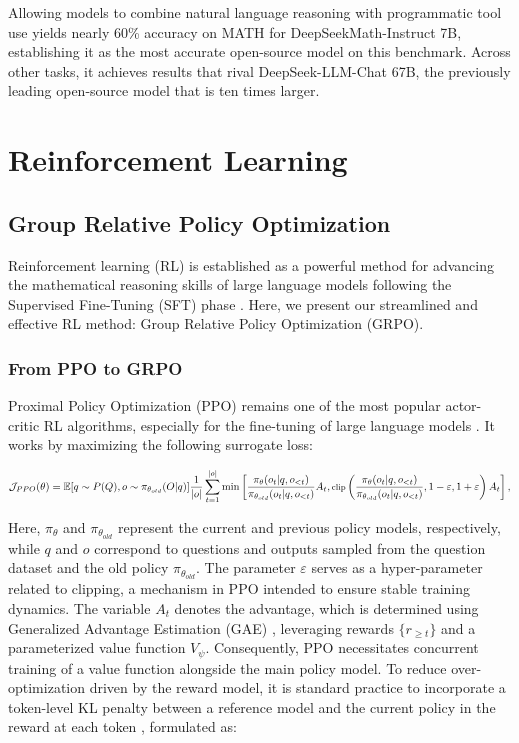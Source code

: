 Allowing models to combine natural language reasoning with programmatic tool use yields nearly 60\% accuracy on MATH for DeepSeekMath-Instruct 7B, establishing it as the most accurate open-source model on this benchmark. Across other tasks, it achieves results that rival DeepSeek-LLM-Chat 67B, the previously leading open-source model that is ten times larger.

\section{Reinforcement Learning}

\subsection{Group Relative Policy Optimization} Reinforcement learning (RL) is established as a powerful method for advancing the mathematical reasoning skills of large language models following the Supervised Fine-Tuning (SFT) phase \citep{wang2023math, wizardmath}. Here, we present our streamlined and effective RL method: Group Relative Policy Optimization (GRPO).

\subsubsection{From PPO to GRPO} Proximal Policy Optimization (PPO) \citep{schulman2017proximal} remains one of the most popular actor-critic RL algorithms, especially for the fine-tuning of large language models \citep{ouyang2022training}. It works by maximizing the following surrogate loss:

\begin{equation}
\footnotesize
    \mathcal{J}_{PPO}(\theta) = \mathbb{E}{[q \sim P(Q), o \sim \pi_{\theta_{old}}(O|q)]} \frac{1}{|o|} \sum_{t=1}^{|o|} \min \left[ \frac{\pi_\theta(o_{t} | q, o_{<t})}{\pi_{\theta_{old}}(o_{t} | q, o_{<t})} A_{t}, \text{clip} \left( \frac{\pi_\theta(o_{t} | q, o_{<t})}{\pi_{\theta_{old}}(o_{t} | q, o_{<t})}, 1 - \varepsilon, 1 + \varepsilon \right)  A_{t} \right] ,
\end{equation}

Here, $\pi_{\theta}$ and $\pi_{\theta_{old}}$ represent the current and previous policy models, respectively, while $q$ and $o$ correspond to questions and outputs sampled from the question dataset and the old policy $\pi_{\theta_{old}}$. The parameter $\varepsilon$ serves as a hyper-parameter related to clipping, a mechanism in PPO intended to ensure stable training dynamics. The variable $A_t$ denotes the advantage, which is determined using Generalized Advantage Estimation (GAE) \citep{gae}, leveraging rewards $\{r_{\ge t}\}$ and a parameterized value function $V_{\psi}$. Consequently, PPO necessitates concurrent training of a value function alongside the main policy model. To reduce over-optimization driven by the reward model, it is standard practice to incorporate a token-level KL penalty between a reference model and the current policy in the reward at each token \citep{ouyang2022training}, formulated as:

